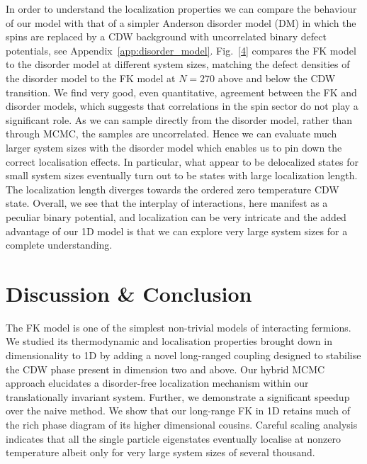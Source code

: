 In order to understand the localization properties we can compare the behaviour of our model with that of a simpler Anderson disorder model (DM) in which the spins are replaced by a CDW background with uncorrelated binary defect potentials, see Appendix~\protect\hyperlink{app:disorder_model}{{[}app:disorder\_model{]}}. Fig.~{[}\protect\hyperlink{fig:indiv_IPR_disorder}{4}{]} compares the FK model to the disorder model at different system sizes, matching the defect densities of the disorder model to the FK model at \(N = 270\) above and below the CDW transition. We find very good, even quantitative, agreement between the FK and disorder models, which suggests that correlations in the spin sector do not play a significant role. As we can sample directly from the disorder model, rather than through MCMC, the samples are uncorrelated. Hence we can evaluate much larger system sizes with the disorder model which enables us to pin down the correct localisation effects. In particular, what appear to be delocalized states for small system sizes eventually turn out to be states with large localization length. The localization length diverges towards the ordered zero temperature CDW state. Overall, we see that the interplay of interactions, here manifest as a peculiar binary potential, and localization can be very intricate and the added advantage of our 1D model is that we can explore very large system sizes for a complete understanding.

\hypertarget{discussion-conclusion}{%
\section{Discussion \& Conclusion}\label{discussion-conclusion}}

The FK model is one of the simplest non-trivial models of interacting fermions. We studied its thermodynamic and localisation properties brought down in dimensionality to 1D by adding a novel long-ranged coupling designed to stabilise the CDW phase present in dimension two and above. Our hybrid MCMC approach elucidates a disorder-free localization mechanism within our translationally invariant system. Further, we demonstrate a significant speedup over the naive method. We show that our long-range FK in 1D retains much of the rich phase diagram of its higher dimensional cousins. Careful scaling analysis indicates that all the single particle eigenstates eventually localise at nonzero temperature albeit only for very large system sizes of several thousand.

